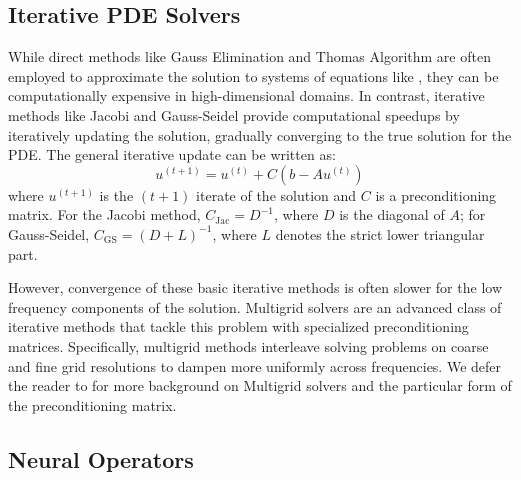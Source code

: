 \documentclass{article} %
\begin{document}
\subsection{Iterative PDE Solvers} \label{sec:finitedifference}

While direct methods like Gauss Elimination and Thomas Algorithm are often employed to approximate the solution to systems of equations like , they can be computationally expensive in high-dimensional domains. In contrast, iterative methods like Jacobi and Gauss-Seidel provide computational speedups by iteratively updating the solution, gradually converging to the true solution for the PDE. The general iterative update can be written as:
\begin{equation}\label{eq:iterativeupdate}
    u^{(t + 1)} = u^{(t)} + C\left(b - Au^{(t)}\right)
\end{equation}
where $u^{(t + 1)}$ is the $(t + 1)$ iterate of the solution and $C$ is a preconditioning matrix. For the Jacobi method, $C_\mathrm{Jac} = D^{-1}$, where $D$ is the diagonal of $A$; for Gauss-Seidel, $C_\mathrm{GS} = (D + L)^{-1}$, where $L$ denotes the strict lower triangular part. 

However, convergence of these basic iterative methods is often slower for the low frequency components of the solution. Multigrid solvers \citep{briggs2000multigrid,trottenberg2001multigrid,hackbusch2013multi} are an advanced class of iterative methods that tackle this problem with specialized preconditioning matrices. Specifically, multigrid methods interleave solving problems on coarse and fine grid resolutions to dampen more uniformly across frequencies.
We defer the reader to  for more background on Multigrid solvers and the particular form of the preconditioning matrix.




\subsection{Neural Operators} \label{sec:neuraloperators}
\end{document}
